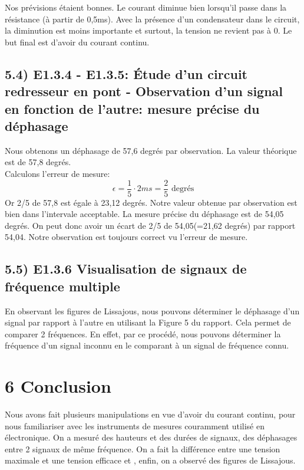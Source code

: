 \documentclass{report}
\begin{document}
Nos pr\'evisions \'etaient bonnes. Le courant diminue bien lorsqu'il passe dans la r\'esistance (\`a partir de 0,5ms). Avec la pr\'esence d'un condensateur dans le circuit, la diminution est moins importante et surtout, la tension ne revient pas \`a 0.
Le but final est d'avoir du courant continu.

\subsection*{5.4) E1.3.4 - E1.3.5: \'Etude d'un circuit redresseur en pont - Observation d'un signal en fonction de l'autre: mesure pr\'ecise du d\'ephasage}
\hspace*{0.5cm}
Nous obtenons un d\'ephasage de 57,6 degr\'es par observation. La valeur th\'eorique est de 57,8 degr\'es.
\\
Calculons l'erreur de mesure:
\begin{equation}
    \epsilon = \frac{1}{5}\cdot 2ms = \frac{2}{5} \text{ degr\'es}
\end{equation}
Or 2/5 de 57,8 est \'egale \`a 23,12 degr\'es. Notre valeur obtenue par observation est bien dans l'intervale acceptable. La mesure pr\'ecise du d\'ephasage est de 54,05 degr\'es. On peut donc avoir un \'ecart de 2/5 de 54,05(=21,62 degr\'es) par rapport 54,04. Notre observation est toujours correct vu l'erreur de mesure.

\subsection*{5.5) E1.3.6 Visualisation de signaux de fr\'equence multiple}
\hspace*{0.5cm}
En observant les figures de Lissajous, nous pouvons d\'eterminer le d\'ephasage d'un signal par rapport \`a l'autre en utilisant la Figure 5 du rapport. Cela permet de comparer 2 fr\'equences. En effet, par ce proc\'ed\'e, nous pouvons d\'eterminer la fr\'equence d'un signal inconnu en le comparant à un signal de fr\'equence connu.

\section*{6 Conclusion}
\hspace*{0.5cm}
Nous avons fait plusieurs manipulations en vue d'avoir du courant continu, pour nous familiariser avec les instruments de mesures couramment utilis\'e en \'electronique. On a mesur\'e des hauteurs et des dur\'ees de signaux, des d\'ephasages entre 2 signaux de m\^eme fr\'equence. On a fait la diff\'erence entre une tension maximale et une tension efficace et , enfin, on a observ\'e des figures de Lissajous.
\end{document}

